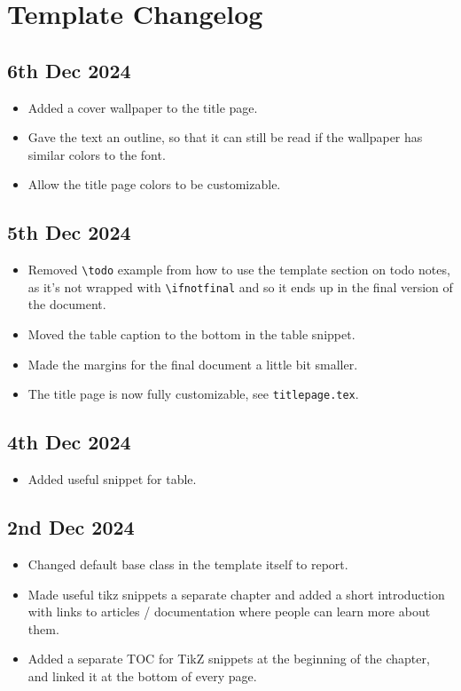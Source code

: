 \chapter*{Template Changelog}

\section*{6th Dec 2024} \label{sec:changelog:2024/12/06}
\begin{itemize}
    \item Added a cover wallpaper to the title page.
    \item Gave the text an outline, so that it can still be read if the wallpaper has similar colors to the font.
    \item Allow the title page colors to be customizable.
\end{itemize}

\section*{5th Dec 2024} \label{sec:changelog:2024/12/05}
\begin{itemize}
    \item Removed \verb|\todo| example from how to use the template section on todo notes, as it's not wrapped with \verb|\ifnotfinal| and so it ends up in the final version of the document.
    \item Moved the table caption to the bottom in the table snippet.
    \item Made the margins for the final document a little bit smaller.
    \item The title page is now fully customizable, see \verb|titlepage.tex|.
\end{itemize}

\section*{4th Dec 2024} \label{sec:changelog:2024/12/04}
\begin{itemize}
    \item Added useful snippet for table.
\end{itemize}

\section*{2nd Dec 2024} \label{sec:changelog:2024/12/02}
\begin{itemize}
    \item Changed default base class in the template itself to report.
    \item Made useful tikz snippets a separate chapter and added a short introduction with links to articles / documentation where people can learn more about them.
    \item Added a separate TOC for TikZ snippets at the beginning of the chapter, and linked it at the bottom of every page.
\end{itemize}

